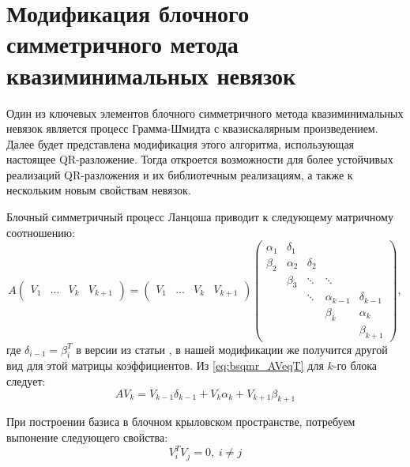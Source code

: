 \section{Модификация блочного симметричного метода квазиминимальных невязок}
\label{sec:bsqmr_mod} 

\par Один из ключевых элементов блочного симметричного метода квазиминимальных невязок \cite{doi:10.1137/0917019}
является процесс Грамма-Шмидта с квазискалярным произведением. Далее будет представлена модификация 
этого алгоритма, использующая настоящее QR-разложение. Тогда откроется возможности для более устойчивых реализаций
QR-разложения и их библиотечным реализациям, а также к нескольким новым свойствам невязок.

\par Блочный симметричный процесс Ланцоша приводит к следующему матричному соотношению:
\begin{equation}
    \label{eq:bsqmr_AVeqT}
    A \begin{pmatrix}
        V_1 & ... & V_k & V_{k+1} 
    \end{pmatrix} = \begin{pmatrix}
        V_1 & ... & V_k & V_{k+1} 
    \end{pmatrix} \begin{pmatrix}
        \alpha_1 & \delta_1 & & & \\
        \beta_2 & \alpha_2 & \delta_2 & & \\
        & \beta_3 & \ddots & \ddots & \\
        & & \ddots & \alpha_{k-1} & \delta_{k-1} \\
        & & & \beta_k & \alpha_k \\
        & & & & \beta_{k+1}
    \end{pmatrix},
\end{equation} 
где $\delta_{i-1} = \beta_i^T$ в версии из статьи \cite{doi:10.1137/0917019}, в нашей
модификации же получится другой вид для этой матрицы коэффициентов. Из \eqref{eq:bsqmr_AVeqT} для $k$-го блока следует: 
\begin{equation}
    \label{eq:bsqmr_last_block}
    AV_k = V_{k-1}\delta_{k-1} + V_k \alpha_k + V_{k+1} \beta_{k+1}
\end{equation}

При построении базиса в блочном крыловском пространстве, потребуем выпонение следующего свойства:
\begin{equation}
    \label{eq:VTVeq0}
V_i^TV_j=0,\;i \neq j
\end{equation}  


